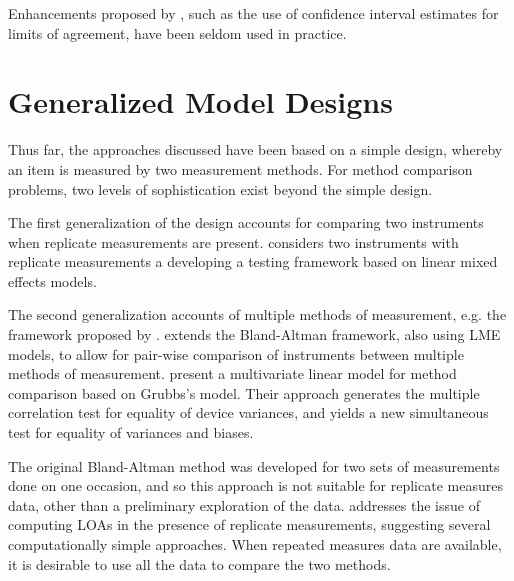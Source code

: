 \documentclass[12pt, a4paper]{report}
\theoremstyle{plain}
\theoremstyle{definition}
\theoremstyle{remark}
\begin{document}




Enhancements proposed by \citet{BA99}, such as the use of confidence interval estimates for limits of agreement, have been seldom used in practice.

\section{Generalized Model Designs}
Thus far, the approaches discussed have been based on a simple design, whereby an item is measured by two measurement methods. For method comparison problems, two levels of sophistication exist beyond the simple design. 

The first generalization of the design accounts for comparing two instruments when replicate measurements are present. \citet{ARoy2009} considers two instruments with replicate measurements a developing a testing framework based on linear mixed effects models.

The second generalization accounts of multiple methods of measurement, e.g. the framework proposed by \citet{Grubbs73}. \citet{BXC2008} extends the Bland-Altman framework, also using LME models, to allow for pair-wise comparison of instruments between multiple methods of measurement. \citet{christensenblackwood} present a multivariate linear model for method comparison based on Grubbs's model. Their approach generates the multiple  correlation test for equality of device variances, and yields a new simultaneous test for equality of variances and biases.


The original Bland-Altman method was developed for two sets of measurements done on one occasion, and so this approach is not suitable for replicate measures data, other than a preliminary exploration of the data. \citet{BA99} addresses the issue of computing LOAs in the presence of replicate measurements, suggesting several computationally simple approaches. When repeated measures data are available, it is desirable to use all the data to compare the two methods. 



%
\end{document}
